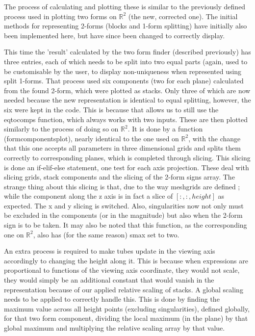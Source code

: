 \documentclass[12pt]{report}
\begin{document}
The process of calculating and plotting these is similar to the previously defined process used in plotting two forms on $\mathbb{R}^{2}$ (the new, corrected one). The initial methods for representing 2-forms (blocks and 1-form splitting) have initially also been implemented here, but have since been changed to correctly display.

This time the 'result' calculated by the two form finder (described previously) has three entries, each of which needs to be split into two equal parts (again, used to be customisable by the user, to display non-uniqueness when represented using split 1-forms. That process used six components (two for each plane) calculated from the found 2-form, which were plotted as stacks. Only three of which are now needed because the new representation is identical to equal splitting, however, the six were kept in the code. This is because that allows us to still use the eq\textunderscore to\textunderscore comps function, which always works with two inputs. These are then plotted similarly to the process of doing so on $\mathbb{R}^{2}$. It is done by a function (form\textunderscore components\textunderscore plot), nearly identical to the one used on $\mathbb{R}^{2}$, with the change that this one accepts all parameters in three dimensional grids and splits them correctly to corresponding planes, which is completed through slicing.
This slicing is done an if-elif-else statement, one test for each axis projection. These deal with slicing grids, stack components and the slicing of the 2-form signs array.
The strange thing about this slicing is that, due to the way meshgrids are defined ; while the component along the z axis is in fact a slice of $[:, :, height]$ as expected. The x and y slicing is switched.
Also, singularities now not only must be excluded in the components (or in the magnitude) but also when the 2-form sign is to be taken.
It may also be noted that this function, as the corresponding one on $\mathbb{R}^{2}$, also has (for the same reason) s\textunderscore max set to two.

\noindent An extra process is required to make tubes update in the viewing axis accordingly to changing the height along it. This is because when expressions are proportional to functions of the viewing axis coordinate, they would not scale, they would simply be an additional constant that would vanish in the representation because of our applied relative scaling of stacks. A global scaling needs to be applied to correctly handle this.
This is done by finding the maximum value across all height points (excluding singularities), defined globally, for that two form component, dividing the local maximum (in the plane) by that global maximum and multiplying the relative scaling array by that value.
\end{document}
